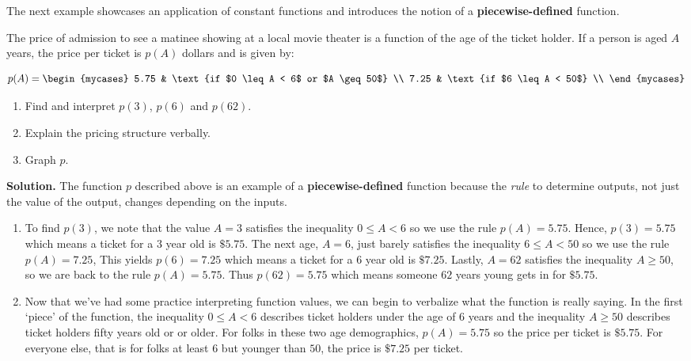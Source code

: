 \medskip

The next example showcases an application of constant functions and introduces the notion of a \textbf{piecewise-defined} function.

\begin{ex} \label{piecewiseconstantex}  The price of admission to see a matinee showing at a local movie theater is a function of the age  of the ticket holder.  If a person is aged $A$ years, the price per ticket is $p(A)$ dollars and is given by:

\[ p(A) = \begin{mycases} 
      5.75 &  \text{if $0 \leq A < 6$ or $A \geq 50$} \\
      7.25  & \text{if $6 \leq A < 50$} \\
   \end{mycases}
\]

\begin{enumerate}

\item Find and interpret $p(3)$, $p(6)$ and $p(62)$.

\item Explain the pricing structure verbally.

\item Graph $p$.

\end{enumerate}

{\bf Solution.}  The function $p$ described above is an example of a  \textbf{piecewise-defined} function because the \textit{rule} to determine outputs, not just the value of the output,  changes depending on the inputs.

\begin{enumerate}

\item To find $p(3)$, we note that the value $A = 3$ satisfies the inequality $0 \leq A < 6$ so we use the rule $p(A) = 5.75$.  Hence, $p(3) = 5.75$ which means a ticket for a $3$ year old is $\$ 5.75$.  The next age, $A = 6$, just barely satisfies the inequality $6 \leq A < 50$ so we use the rule $p(A) = 7.25$, This yields $p(6) = 7.25$ which means a ticket for a $6$ year old is $\$ 7.25$.  Lastly, $A = 62$ satisfies the inequality $A \geq 50$, so we are back to the rule $p(A) = 5.75$.  Thus $p(62) = 5.75$ which means someone $62$ years young gets in for $\$ 5.75$.

\item  Now that we've had some practice interpreting function values, we can begin to verbalize what the function is really saying.  In the first `piece' of the function, the inequality $0 \leq A < 6$  describes ticket holders under the age of 6 years and  the inequality $A \geq 50$ describes ticket holders fifty years old or or older.  For  folks in these two age demographics, $p(A) = 5.75$ so the price per ticket is $\$ 5.75$.  For everyone else, that is for folks at least $6$ but younger than $50$, the price is $\$7.25$ per ticket.


\end{enumerate}
\end{ex}
